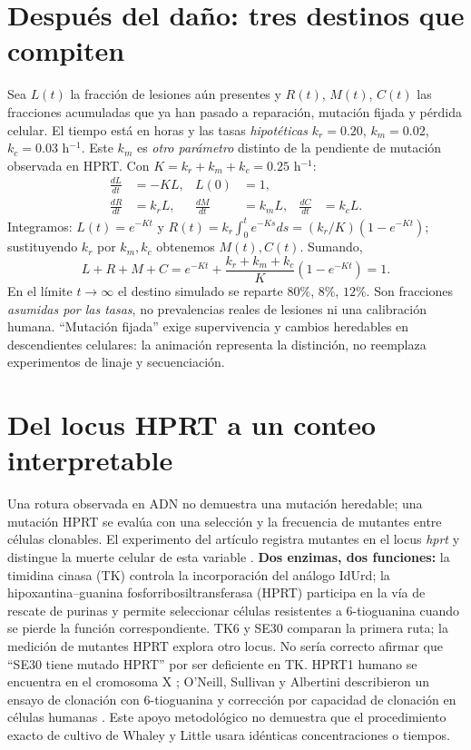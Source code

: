 \documentclass[11pt,a4paper]{article}
\begin{document}
\section{Después del daño: tres destinos que compiten}
Sea $L(t)$ la fracción de lesiones aún presentes y $R(t)$, $M(t)$, $C(t)$ las fracciones acumuladas que ya han pasado a reparación, mutación fijada y pérdida celular. El tiempo está en horas y las tasas \emph{hipotéticas} $k_r=0.20$, $k_m=0.02$, $k_c=0.03$ h$^{-1}$. Este $k_m$ es \emph{otro parámetro} distinto de la pendiente de mutación observada en HPRT. Con $K=k_r+k_m+k_c=0.25$ h$^{-1}$:
\begin{align}
\frac{dL}{dt}&=-KL,&L(0)&=1,\\
\frac{dR}{dt}&=k_rL,&\frac{dM}{dt}&=k_mL,&\frac{dC}{dt}&=k_cL.
\end{align}
Integramos: $L(t)=e^{-Kt}$ y $R(t)=k_r\int_0^t e^{-Ks}ds=(k_r/K)(1-e^{-Kt})$; sustituyendo $k_r$ por $k_m,k_c$ obtenemos $M(t),C(t)$. Sumando,
\begin{equation}L+R+M+C=e^{-Kt}+\frac{k_r+k_m+k_c}{K}(1-e^{-Kt})=1.\end{equation}
En el límite $t\to\infty$ el destino simulado se reparte $80\%$, $8\%$, $12\%$. Son fracciones \emph{asumidas por las tasas}, no prevalencias reales de lesiones ni una calibración humana. ``Mutación fijada'' exige supervivencia y cambios heredables en descendientes celulares: la animación representa la distinción, no reemplaza experimentos de linaje y secuenciación.

\section{Del locus HPRT a un conteo interpretable}\label{sec:hprt}
Una rotura observada en ADN no demuestra una mutación heredable; una mutación HPRT se evalúa con una selección y la frecuencia de mutantes entre células clonables. El experimento del artículo registra mutantes en el locus \emph{hprt} y distingue la muerte celular de esta variable \cite{whaley}.
\textbf{Dos enzimas, dos funciones:} la timidina cinasa (TK) controla la incorporación del análogo IdUrd; la hipoxantina--guanina fosforribosiltransferasa (HPRT) participa en la vía de rescate de purinas y permite seleccionar células resistentes a 6-tioguanina cuando se pierde la función correspondiente. TK6 y SE30 comparan la primera ruta; la medición de mutantes HPRT explora otro locus. No sería correcto afirmar que ``SE30 tiene mutado HPRT'' por ser deficiente en TK. HPRT1 humano se encuentra en el cromosoma X \cite{gene}; O'Neill, Sullivan y Albertini describieron un ensayo de clonación con 6-tioguanina y corrección por capacidad de clonación en células humanas \cite{oneill}. Este apoyo metodológico no demuestra que el procedimiento exacto de cultivo de Whaley y Little usara idénticas concentraciones o tiempos.
\end{document}
